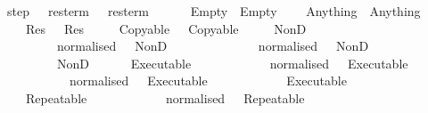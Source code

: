 \isamarkupfalse%
\ step\ {\isacharcolon}{\isacharcolon}\ {\isachardoublequoteopen}\ res{\isacharunderscore}term\ {\isasymRightarrow}\ \ res{\isacharunderscore}term{\isachardoublequoteclose}\ \isanewline
\ \ \ \ {\isachardoublequoteopen}\ Empty\ {\isacharequal}\ Empty{\isachardoublequoteclose}\isanewline
\ \ {\isacharbar}\ {\isachardoublequoteopen}\ Anything\ {\isacharequal}\ Anything{\isachardoublequoteclose}\isanewline
\ \ {\isacharbar}\ {\isachardoublequoteopen}\ {\isacharparenleft}Res\ \ {\isacharequal}\ Res\ \isanewline
\ \ {\isacharbar}\ {\isachardoublequoteopen}\ {\isacharparenleft}Copyable\ \ {\isacharequal}\ Copyable\ \isanewline
\ \ {\isacharbar}\ {\isachardoublequoteopen}\ {\isacharparenleft}NonD\ \ \ {\isacharequal}\isanewline
\ \ \ \ \ \ {\isacharparenleft}\ \ {\isasymnot}\ normalised\ \ \ NonD\ {\isacharparenleft}\ \ \isanewline
\ \ \ \ \ \ \ \ \ \ {\isasymnot}\ normalised\ \ \ NonD\ \ {\isacharparenleft}\ \isanewline
\ \ \ \ \ \ \ \ \ NonD\ \ \isanewline
\ \ {\isacharbar}\ {\isachardoublequoteopen}\ {\isacharparenleft}Executable\ \ \ {\isacharequal}\isanewline
\ \ \ \ \ \ {\isacharparenleft}\ \ {\isasymnot}\ normalised\ \ \ Executable\ {\isacharparenleft}\ \ \isanewline
\ \ \ \ \ \ \ \ \ \ {\isasymnot}\ normalised\ \ \ Executable\ \ {\isacharparenleft}\ \isanewline
\ \ \ \ \ \ \ \ \ Executable\ \ \isanewline
\ \ {\isacharbar}\ {\isachardoublequoteopen}\ {\isacharparenleft}Repeatable\ \ \ {\isacharequal}\isanewline
\ \ \ \ \ \ {\isacharparenleft}\ \ {\isasymnot}\ normalised\ \ \ Repeatable\ {\isacharparenleft}\ \ \isanewline
